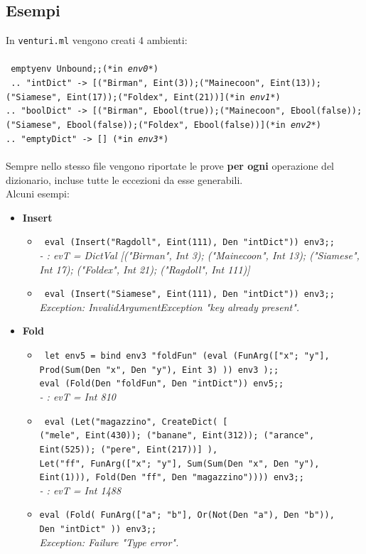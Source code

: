 \documentclass[10pt, a4paper]{article}
\begin{document}
\subsection{Esempi}
In \texttt{venturi.ml} vengono creati 4 ambienti:\\ \\
\texttt{
emptyenv Unbound;;(*in \emph{env0}*)\\{
.. "intDict" -> [("Birman", Eint(3));("Mainecoon", Eint(13));("Siamese", Eint(17));("Foldex", Eint(21))](*in \emph{env1}*)\\
.. "boolDict" -> [("Birman", Ebool(true));("Mainecoon", Ebool(false));("Siamese", Ebool(false));("Foldex", Ebool(false))](*in \emph{env2}*)\\
.. "emptyDict" -> [] (*in \emph{env3}*)}
}\\ \\
Sempre nello stesso file vengono riportate le prove \textbf{per ogni} operazione del dizionario, incluse tutte le eccezioni da esse generabili.\\
Alcuni esempi: 
\begin{itemize}
\item \textbf{Insert} 
\begin{itemize}
\item \texttt{
eval (Insert("Ragdoll", Eint(111), Den "intDict")) env3;;}\\\textit{- : evT =
DictVal
 [("Birman", Int 3); ("Mainecoon", Int 13); ("Siamese", Int 17);
  ("Foldex", Int 21); ("Ragdoll", Int 111)]}
\item \texttt{
		eval (Insert("Siamese", Eint(111), Den "intDict")) env3;;}\\\textit{Exception: InvalidArgumentException "key already present".
}
\end{itemize}
\item \textbf{Fold}
\begin{itemize}
\item \texttt{
let env5 = bind env3 "foldFun" (eval (FunArg(["x"; "y"], Prod(Sum(Den "x", Den "y"), Eint 3) )) env3 );;\\
eval (Fold(Den "foldFun", Den "intDict")) env5;;} \\ \textit{- : evT = Int 810}

\item \texttt{
eval (Let("magazzino", CreateDict( [\\ ("mele", Eint(430)); ("banane", Eint(312)); ("arance", Eint(525)); ("pere", Eint(217))] ),\\ 
	Let("ff", FunArg(["x"; "y"], Sum(Sum(Den "x", Den "y"), Eint(1))), Fold(Den "ff", Den "magazzino")))) env3;;}\\ \textit{- : evT = Int 1488}
	
\item \texttt{eval (Fold(
			FunArg(["a"; "b"], Or(Not(Den "a"), Den "b")),\\
			Den "intDict"  
		)) env3;;} \\ \textit{Exception: Failure "Type error".}
\end{itemize}
\end{itemize}
\end{document}

